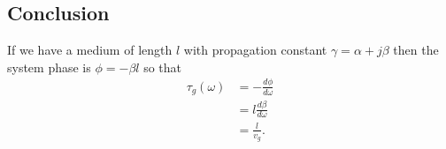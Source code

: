 \documentclass{article}
\begin{document}
		\subsection{Conclusion}
If we have a medium of length $l$ with propagation constant $\gamma=\alpha+j\beta$ then the system phase is $\phi=-\beta{l}$ so that
\begin{equation}
	\begin{split}
		\tau_g(\omega)&=-\frac{d\phi}{d\omega}\\
		&=l\frac{d\beta}{d\omega}\\
		&=\frac{l}{v_g}.
	\end{split}
\end{equation}
\end{document}
